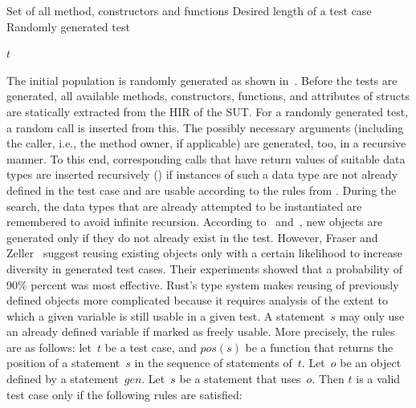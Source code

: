 \documentclass[paper=a4,%
  twoside,%
  BCOR4mm,%
  abstract=true,%
  toc=bibliography,%
  chapterprefix=true,%
  toc=bibliographynumbered,%
  open=right,%
  english,%
  pagesize=pdftex]{scrreprt}
\newcommand{\Desc}[2]{\State \makebox[2em][l]{#1}#2}
\newcommand{\hir}{\ac{HIR}\xspace}
\newcommand{\sut}{\ac{SUT}\xspace}
\begin{document}
\begin{algorithm}[t]
\caption{$GenTest(M, l)$}\label{alg:gentest}
\begin{algorithmic}
\Input
  \Desc{$M$}{Set of all method, constructors and functions}
  \Desc{$l$}{Desired length of a test case}
\EndInput
\Output
  \Desc{$t$}{Randomly generated test}
\EndOutput
{}


\EndFor
{}

    \EndIf
  \EndFor
\EndWhile
\State \Return $t$
\end{algorithmic}
\end{algorithm}

The initial population is randomly generated as shown in~. Before the tests are generated, all available methods, constructors, functions, and attributes of structs are statically extracted from the \hir of the \sut. For a randomly generated test, a random call is inserted from this. The possibly necessary arguments (including the caller, i.e., the method owner, if applicable) are generated, too, in a recursive manner. To this end, corresponding calls that have return values of suitable data types are inserted recursively () if instances of such a data type are not already defined in the test case and are usable according to the rules from . During the search, the data types that are already attempted to be instantiated are remembered to avoid infinite recursion. According to~ and~, new objects are generated only if they do not already exist in the test. However, Fraser and Zeller~\cite{Fraser2012} suggest reusing existing objects only with a certain likelihood to increase diversity in generated test cases. Their experiments showed that a probability of 90\% percent was most effective. Rust's type system makes reusing of previously defined objects more complicated because it requires analysis of the extent to which a given variable is still usable in a given test. A statement~$s$ may only use an already defined variable if marked as freely usable. More precisely, the rules are as follows: let~$t$ be a test case, and $pos(s)$ be a function that returns the position of a statement~$s$ in the sequence of statements of~$t$. Let~$o$ be an object defined by a statement~$gen$. Let~$s$ be a statement that uses~$o$. Then $t$ is a valid test case only if the following rules are satisfied:
\end{document}

